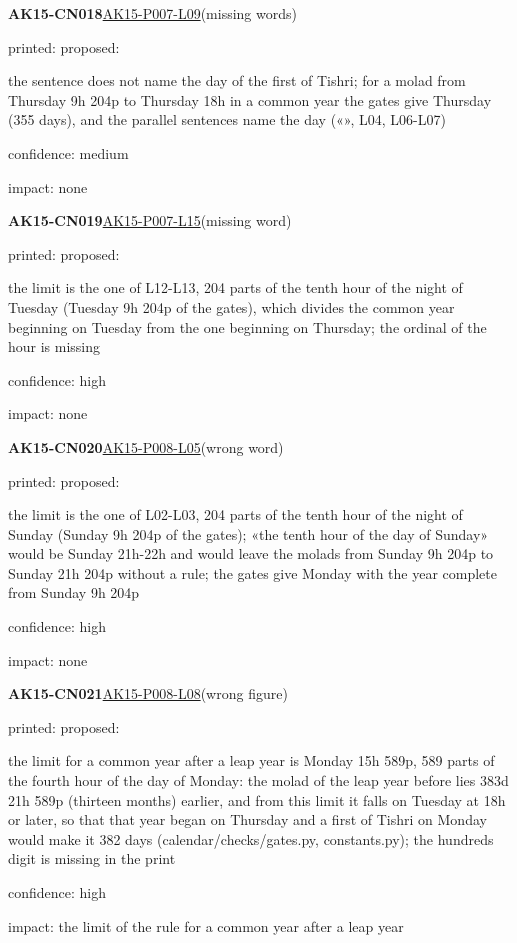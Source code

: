 \documentclass[11pt]{article}
\begin{document}
\noindent\textbf{AK15-CN018}\enspace\hyperlink{AK15-P007-L09}{AK15-P007-L09}\enspace(missing words)\par\noindent printed: \enspace proposed: \par\noindent the sentence does not name the day of the first of Tishri; for a molad from Thursday 9h 204p to Thursday 18h in a common year the gates give Thursday (355 days), and the parallel sentences name the day («», L04, L06-L07)\par\noindent confidence: medium\par\noindent impact: none\par\medskip
\noindent\textbf{AK15-CN019}\enspace\hyperlink{AK15-P007-L15}{AK15-P007-L15}\enspace(missing word)\par\noindent printed: \enspace proposed: \par\noindent the limit is the one of L12-L13, 204 parts of the tenth hour of the night of Tuesday (Tuesday 9h 204p of the gates), which divides the common year beginning on Tuesday from the one beginning on Thursday; the ordinal of the hour is missing\par\noindent confidence: high\par\noindent impact: none\par\medskip
\noindent\textbf{AK15-CN020}\enspace\hyperlink{AK15-P008-L05}{AK15-P008-L05}\enspace(wrong word)\par\noindent printed: \enspace proposed: \par\noindent the limit is the one of L02-L03, 204 parts of the tenth hour of the night of Sunday (Sunday 9h 204p of the gates); «the tenth hour of the day of Sunday» would be Sunday 21h-22h and would leave the molads from Sunday 9h 204p to Sunday 21h 204p without a rule; the gates give Monday with the year complete from Sunday 9h 204p\par\noindent confidence: high\par\noindent impact: none\par\medskip
\noindent\textbf{AK15-CN021}\enspace\hyperlink{AK15-P008-L08}{AK15-P008-L08}\enspace(wrong figure)\par\noindent printed: \enspace proposed: \par\noindent the limit for a common year after a leap year is Monday 15h 589p, 589 parts of the fourth hour of the day of Monday: the molad of the leap year before lies 383d 21h 589p (thirteen months) earlier, and from this limit it falls on Tuesday at 18h or later, so that that year began on Thursday and a first of Tishri on Monday would make it 382 days (calendar/checks/gates.py, constants.py); the hundreds digit is missing in the print\par\noindent confidence: high\par\noindent impact: the limit of the rule for a common year after a leap year\par\medskip
\end{document}
